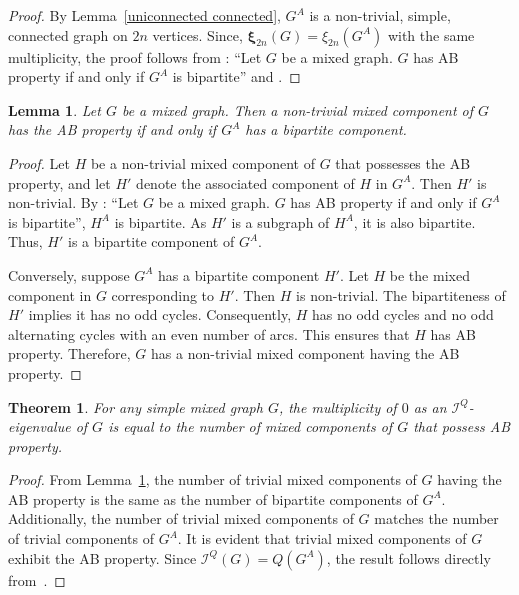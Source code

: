 \documentclass[12pt]{article}
\numberwithin{equation}{section}
\newtheorem{thm}{Theorem}[section]
\newtheorem{lemma}{Lemma}[section]
\begin{document}
	\begin{proof}
		By Lemma~\ref{uniconnected connected}, $ G^A $ is a non-trivial, simple, connected graph on $ 2n $ vertices. Since, $\bm{\xi}_{2n}(G)=\xi_{2n}(G^A)$ with the same multiplicity,  the proof follows from \cite[Lemma~4.1]{Kalaimatrices1}: ``Let $G$ be a mixed graph. $G$ has AB property if and only if $G^A$ is bipartite''  and \cite[Theorem~7.8.1]{cvetkovic}.
%		
	\end{proof}
	\begin{lemma}\label{ABcomponentbipartite}
		Let $G$ be a mixed graph. Then a non-trivial mixed component of $G$ has the AB property if and only if $G^A$ has a bipartite component.
	\end{lemma}
	\begin{proof}
		Let $H$ be a non-trivial mixed component of $G$ that possesses the AB property, and let $H'$ denote the associated component of $H$ in $G^A$. Then $H'$ is non-trivial. By \cite[Lemma~4.1]{Kalaimatrices1}: ``Let $G$ be a mixed graph. $G$ has AB property if and only if $G^A$ is bipartite'', $H^A$ is bipartite. As $H'$ is a subgraph of $H^A$, it is also bipartite. Thus, $H'$ is a bipartite component of $G^A$.
		
		Conversely, suppose $G^A$ has a bipartite component $H'$. Let $H$ be the mixed component in $G$ corresponding to $H'$. Then $H$ is non-trivial. The bipartiteness of $H'$ implies it has no odd cycles. Consequently,  $H$ has no odd cycles and no odd alternating cycles with an even number of arcs. This ensures that $H$ has AB property. Therefore, $G$ has a non-trivial mixed component having the AB property. 
	\end{proof}
	\begin{thm}\label{thm3.6}
		For any simple mixed graph $G$, the multiplicity of $0$ as an $\mathcal{I}^Q$-eigenvalue of $G$ is equal to the number of mixed components of $G$ that possess AB property.
	\end{thm}
	\begin{proof}
		From Lemma~\ref{ABcomponentbipartite}, the number of trivial mixed components of $G$ having the AB property is the same as the number of bipartite components of $G^A$. Additionally, the number of trivial mixed components of $G$ matches the number of trivial components of $G^A$. It is evident that trivial mixed components of $G$ exhibit the AB property. Since  $\mathcal{I}^Q(G)=Q(G^A)$,  the result follows directly from~\cite[Corollary~7.8.2]{cvetkovic}.
%		
	\end{proof}
	
\end{document}
